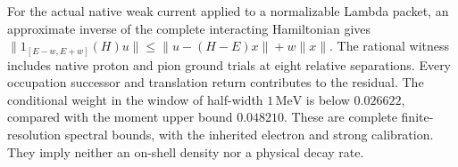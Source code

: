 For the actual native weak current applied to a normalizable Lambda packet,
an approximate inverse of the complete interacting Hamiltonian gives
\(\|1_{[E-w,E+w]}(H)u\|\leq\|u-(H-E)x\|+w\|x\|\).
The rational witness includes native proton and pion ground trials at eight
relative separations. Every occupation successor and translation return
contributes to the residual. The conditional weight in the window of
half-width \(1\,\mathrm{MeV}\) is below \(0.026622\), compared with the
moment upper bound \(0.048210\). These are complete finite-resolution
spectral bounds, with the inherited electron and strong calibration.
They imply neither an on-shell density nor a physical decay rate.
